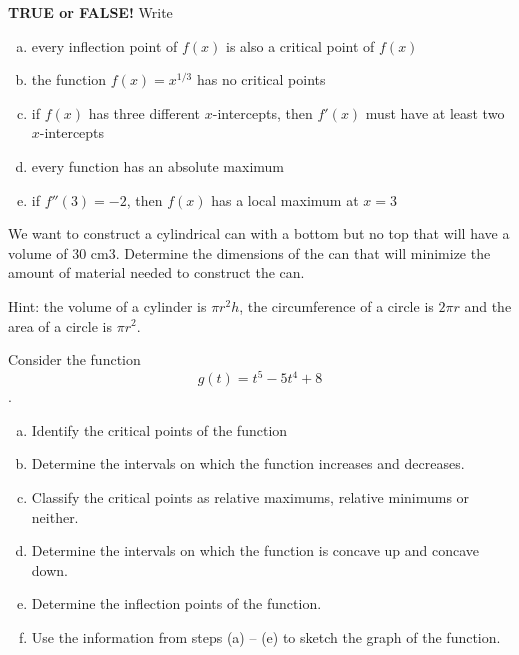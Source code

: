 \documentclass[11pt]{exam}
\theoremstyle{definition}
\begin{document}
\begin{questions}

\addpoints

\question[10]\mbox{}
\textbf{TRUE or FALSE!}  Write 
\begin{enumerate}[(a)]
\item every inflection point of $f(x)$ is also a critical point of $f(x)$
\vspace{1.2in}
\item the function $f(x) = x^{1/3}$ has no critical points
\vspace{1.2in}
\item if $f(x)$ has three different $x$-intercepts, then $f'(x)$ must have at least two $x$-intercepts
\vspace{1.2in}
\item every function has an absolute maximum
\vspace{1.2in}
\item if $f''(3) = -2$, then $f(x)$ has a local maximum at $x=3$
\vspace{1.2in}
\end{enumerate}

\newpage
\question[10]\mbox{}

We want to construct a cylindrical can with a bottom but no top that will have a volume of 30 cm3. Determine the dimensions of the can that will minimize the amount of material needed to construct the can.

Hint: the volume of a cylinder is $\pi r^2h$, the circumference of a circle is $2\pi r$ and the area of a circle is $\pi r^2$.

\newpage
\question[10]

Consider the function
$$g(t) = t^5-5t^4+8$$.

\begin{enumerate}[(a)]
\item Identify the critical points of the function
\item Determine the intervals on which the function increases and decreases.
\item Classify the critical points as relative maximums, relative minimums or neither.
\item Determine the intervals on which the function is concave up and concave down.
\item Determine the inflection points of the function.
\item Use the information from steps (a) – (e) to sketch the graph of the function.
\end{enumerate}


\end{questions}
\end{document}
